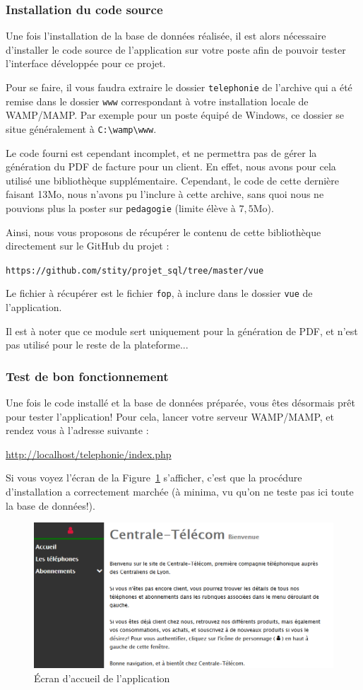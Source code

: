 \subsubsection{Installation du code source}
Une fois l'installation de la base de données réalisée, il est alors nécessaire d'installer le code source de l'application sur votre poste afin de pouvoir tester l'interface développée pour ce projet.

Pour se faire, il vous faudra extraire le dossier \texttt{telephonie} de l'archive qui a été remise dans le dossier \texttt{www} correspondant à votre installation locale de WAMP/MAMP. Par exemple pour un poste équipé de Windows, ce dossier se situe généralement à \texttt{C:\textbackslash wamp\textbackslash www}.

Le code fourni est cependant incomplet, et ne permettra pas de gérer la génération du PDF de facture pour un client. En effet, nous avons pour cela utilisé une bibliothèque supplémentaire. Cependant, le code de cette dernière faisant 13Mo, nous n'avons pu l'inclure à cette archive, sans quoi nous ne pouvions plus la poster sur \texttt{pedagogie} (limite élève à $7,5$Mo).

Ainsi, nous vous proposons de récupérer le contenu de cette bibliothèque directement sur le GitHub du projet :
\begin{center}
  \texttt{https://github.com/stity/projet\_sql/tree/master/vue}
\end{center}
Le fichier à récupérer est le fichier \texttt{fop}, à inclure dans le dossier \texttt{vue} de l'application.

Il est à noter que ce module sert uniquement pour la génération de PDF, et n'est pas utilisé pour le reste de la plateforme...

\subsubsection{Test de bon fonctionnement}
Une fois le code installé et la base de données préparée, vous êtes désormais prêt pour tester l'application! Pour cela, lancer votre serveur WAMP/MAMP, et rendez vous à l'adresse suivante :
\begin{center}
  \url{http://localhost/telephonie/index.php}
\end{center}
Si vous voyez l'écran de la Figure~\ref{fig:hello-world} s'afficher, c'est que la procédure d'installation a correctement marchée (à minima, vu qu'on ne teste pas ici toute la base de données!).

\begin{figure}[ht]
  \centering
  \includegraphics[width=.5\textwidth]{images/Travail_realise/hello-world}
  \caption{\'Ecran d'accueil de l'application}
  \label{fig:hello-world}
\end{figure}

